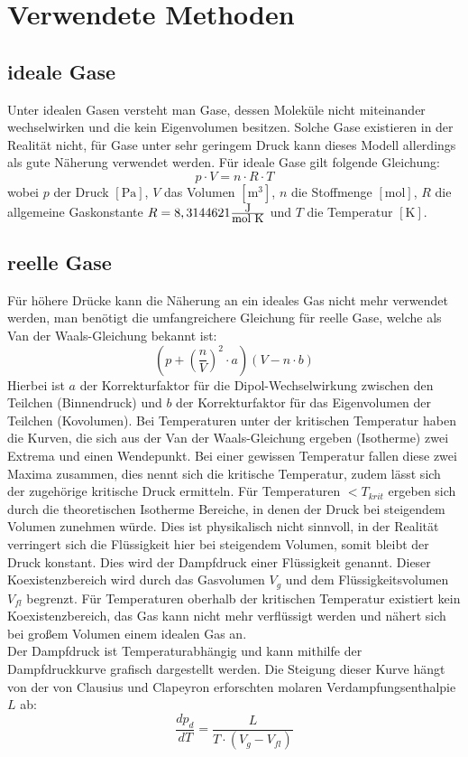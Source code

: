\section{Verwendete Methoden}
\subsection{ideale Gase}
Unter idealen Gasen versteht man Gase, dessen Moleküle nicht miteinander wechselwirken und die kein Eigenvolumen besitzen. Solche Gase existieren in der Realität nicht, für Gase unter sehr geringem Druck kann dieses Modell allerdings als gute Näherung verwendet werden. Für ideale Gase gilt folgende Gleichung:
\begin{equation}
p \cdot V = n \cdot R \cdot T
\end{equation}
wobei $p$ der Druck $[\mathrm{Pa}]$, $V$ das Volumen $[\mathrm{m^3}]$, $n$ die Stoffmenge $[\mathrm{mol}]$, $R$ die allgemeine Gaskonstante $R=8,3144621 \frac{\text{\fontsize{9}{1}\selectfont {J}}}{\text{\fontsize{9}{1}\selectfont {mol K}}}$ und $T$ die Temperatur $[\mathrm{K}]$.
\subsection{reelle Gase}
Für höhere Drücke kann die Näherung an ein ideales Gas nicht mehr verwendet werden, man benötigt die umfangreichere Gleichung für reelle Gase, welche als Van der Waals-Gleichung bekannt ist:
\begin{equation}
(p+\left(\frac{n}{V}\right)^2 \cdot a)(V - n \cdot b)
\end{equation}
Hierbei ist $a$ der Korrekturfaktor für die Dipol-Wechselwirkung zwischen den Teilchen (Binnendruck) und $b$ der Korrekturfaktor für das Eigenvolumen der Teilchen (Kovolumen). Bei Temperaturen unter der kritischen Temperatur haben die Kurven, die sich aus der Van der Waals-Gleichung ergeben (Isotherme) zwei Extrema und einen Wendepunkt. Bei einer gewissen Temperatur fallen diese zwei Maxima zusammen, dies nennt sich die kritische Temperatur, zudem lässt sich der zugehörige kritische Druck ermitteln. Für Temperaturen $< T_{krit}$ ergeben sich durch die theoretischen Isotherme Bereiche, in denen der Druck bei steigendem Volumen zunehmen würde. Dies ist physikalisch nicht sinnvoll, in der Realität verringert sich die Flüssigkeit hier bei steigendem Volumen, somit bleibt der Druck konstant. Dies wird der Dampfdruck einer Flüssigkeit genannt. Dieser Koexistenzbereich wird durch das Gasvolumen $V_g$ und dem Flüssigkeitsvolumen $V_{fl}$ begrenzt. Für Temperaturen oberhalb der kritischen Temperatur existiert kein Koexistenzbereich, das Gas kann nicht mehr verflüssigt werden und nähert sich bei großem Volumen einem idealen Gas an.\\
Der Dampfdruck ist Temperaturabhängig und kann mithilfe der Dampfdruckkurve grafisch dargestellt werden. Die Steigung dieser Kurve hängt von der von Clausius und Clapeyron erforschten molaren Verdampfungsenthalpie $L$ ab:
\begin{equation}
\frac{dp_d}{dT} = \frac{L}{T \cdot (V_g-V_{fl})} \label{eq:cc}
\end{equation}

